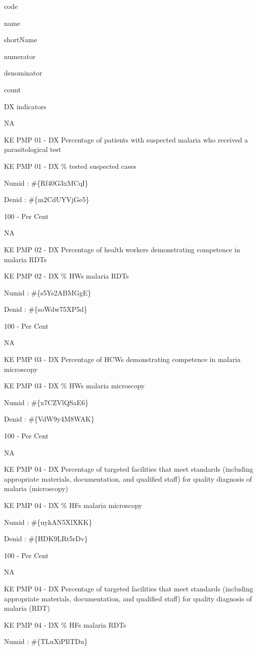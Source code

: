 \documentclass[]{book}
\begin{document}
code

name

shortName

numerator

denominator

count

DX indicators

NA

KE PMP 01 - DX Percentage of patients with suspected malaria who received a parasitological test

KE PMP 01 - DX \% tested suspected cases

Numid : \#\{Rf40G3xMCqI\}

Denid : \#\{m2CdUYVjGe5\}

100 - Per Cent

NA

KE PMP 02 - DX Percentage of health workers demonstrating competence in malaria RDTs

KE PMP 02 - DX \% HWs malaria RDTs

Numid : \#\{s5Ys2ABMGgE\}

Denid : \#\{soWdw75XP5d\}

100 - Per Cent

NA

KE PMP 03 - DX Percentage of HCWs demonstrating competence in malaria microscopy

KE PMP 03 - DX \% HWs malaria microscopy

Numid : \#\{x7CZVlQSaE6\}

Denid : \#\{VdW9y4M8WAK\}

100 - Per Cent

NA

KE PMP 04 - DX Percentage of targeted facilities that meet standards (including appropriate materials, documentation, and qualified staff) for quality diagnosis of malaria (microscopy)

KE PMP 04 - DX \% HFs malaria microscopy

Numid : \#\{uykAN5XlXKK\}

Denid : \#\{HDK9LRt5rDv\}

100 - Per Cent

NA

KE PMP 04 - DX Percentage of targeted facilities that meet standards (including appropriate materials, documentation, and qualified staff) for quality diagnosis of malaria (RDT)

KE PMP 04 - DX \% HFs malaria RDTs

Numid : \#\{TLuXiPIlTDu\}
\end{document}
